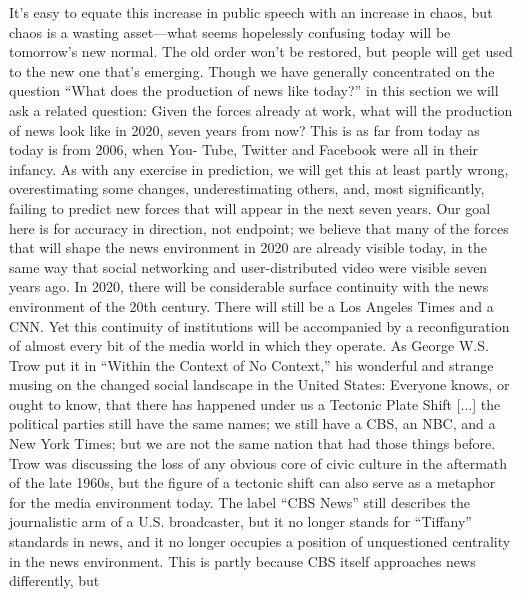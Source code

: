 It’s easy to equate this increase in public speech with an increase in chaos, but
chaos is a wasting asset—what seems hopelessly confusing today will be tomorrow’s
new normal. The old order won’t be restored, but people will get used to
the new one that’s emerging.
Though we have generally concentrated on the question ``What does the production
of news like today?'' in this section we will ask a related question: Given
the forces already at work, what will the production of news look like in 2020,
seven years from now? This is as far from today as today is from 2006, when You-
Tube, Twitter and Facebook were all in their infancy.
As with any exercise in prediction, we will get this at least partly wrong, overestimating
some changes, underestimating others, and, most significantly, failing to
predict new forces that will appear in the next seven years. Our goal here is for
accuracy in direction, not endpoint; we believe that many of the forces that will
shape the news environment in 2020 are already visible today, in the same way
that social networking and user-distributed video were visible seven years ago.
In 2020, there will be considerable surface continuity with the news environment
of the 20th century. There will still be a Los Angeles Times and a CNN. Yet
this continuity of institutions will be accompanied by a reconfiguration of almost
every bit of the media world in which they operate. As George W.S. Trow put it
in ``Within the Context of No Context,'' his wonderful and strange musing on
the changed social landscape in the United States:
Everyone knows, or ought to know, that there has happened under us
a Tectonic Plate Shift [...] the political parties still have the same names;
we still have a CBS, an NBC, and a New York Times; but we are not the
same nation that had those things before.
Trow was discussing the loss of any obvious core of civic culture in the aftermath
of the late 1960s, but the figure of a tectonic shift can also serve as a metaphor for
the media environment today. The label ``CBS News'' still describes the journalistic
arm of a U.S. broadcaster, but it no longer stands for ``Tiffany'' standards in
news, and it no longer occupies a position of unquestioned centrality in the news
environment. This is partly because CBS itself approaches news differently, but

